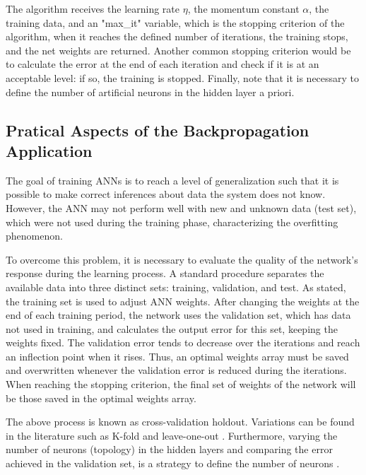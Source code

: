 
The algorithm receives the learning rate $\eta$, the momentum constant $\alpha$, the training data, and an "max\_it" variable, which is the stopping criterion of the algorithm, when it reaches the defined number of iterations, the training stops, and the net weights are returned. Another common stopping criterion would be to calculate the error at the end of each iteration and check if it is at an acceptable level: if so, the training is stopped. Finally, note that it is necessary to define the number of artificial neurons in the hidden layer a priori.

\subsection{Pratical Aspects of the Backpropagation Application}
\label{ssec:Pratical}

The goal of training ANNs is to reach a level of generalization such that it is possible to make correct inferences about data the system does not know. However, the ANN may not perform well with new and unknown data (test set), which were not used during the training phase, characterizing the overfitting phenomenon.

To overcome this problem, it is necessary to evaluate the quality of the network's response during the learning process. A standard procedure separates the available data into three distinct sets: training, validation, and test. As stated, the training set is used to adjust ANN weights. After changing the weights at the end of each training period, the network uses the validation set, which has data not used in training, and calculates the output error for this set, keeping the weights fixed. The validation error tends to decrease over the iterations and reach an inflection point when it rises. Thus, an optimal weights array must be saved and overwritten whenever the validation error is reduced during the iterations. When reaching the stopping criterion, the final set of weights of the network will be those saved in the optimal weights array. %

The above process is known as cross-validation holdout. Variations can be found in the literature such as K-fold and leave-one-out \cite{haykin, Castro2006FundamentalsON}.
Furthermore, varying the number of neurons (topology) in the hidden layers and comparing the error achieved in the validation set, is a strategy to define the number of neurons \cite{James2013}.

